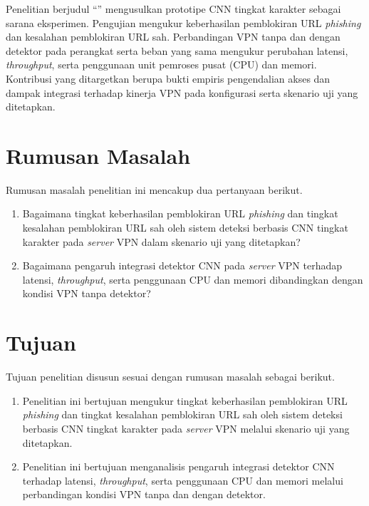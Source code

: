 Penelitian berjudul \enquote{\judulpenelitian} mengusulkan prototipe CNN tingkat karakter sebagai sarana eksperimen. Pengujian mengukur keberhasilan pemblokiran URL \textit{phishing} dan kesalahan pemblokiran URL sah. Perbandingan VPN tanpa dan dengan detektor pada perangkat serta beban yang sama mengukur perubahan latensi, \textit{throughput}, serta penggunaan unit pemroses pusat (CPU) dan memori. Kontribusi yang ditargetkan berupa bukti empiris pengendalian akses dan dampak integrasi terhadap kinerja VPN pada konfigurasi serta skenario uji yang ditetapkan.

\section{Rumusan Masalah}

Rumusan masalah penelitian ini mencakup dua pertanyaan berikut.
\begin{enumerate}[leftmargin=*, itemsep=0.35em]
  \item Bagaimana tingkat keberhasilan pemblokiran URL \textit{phishing} dan tingkat kesalahan pemblokiran URL sah oleh sistem deteksi berbasis CNN tingkat karakter pada \textit{server} VPN dalam skenario uji yang ditetapkan?
  \item Bagaimana pengaruh integrasi detektor CNN pada \textit{server} VPN terhadap latensi, \textit{throughput}, serta penggunaan CPU dan memori dibandingkan dengan kondisi VPN tanpa detektor?
\end{enumerate}

\section{Tujuan}

Tujuan penelitian disusun sesuai dengan rumusan masalah sebagai berikut.
\begin{enumerate}[leftmargin=*, itemsep=0.35em]
  \item Penelitian ini bertujuan mengukur tingkat keberhasilan pemblokiran URL \textit{phishing} dan tingkat kesalahan pemblokiran URL sah oleh sistem deteksi berbasis CNN tingkat karakter pada \textit{server} VPN melalui skenario uji yang ditetapkan.
  \item Penelitian ini bertujuan menganalisis pengaruh integrasi detektor CNN terhadap latensi, \textit{throughput}, serta penggunaan CPU dan memori melalui perbandingan kondisi VPN tanpa dan dengan detektor.
\end{enumerate}

